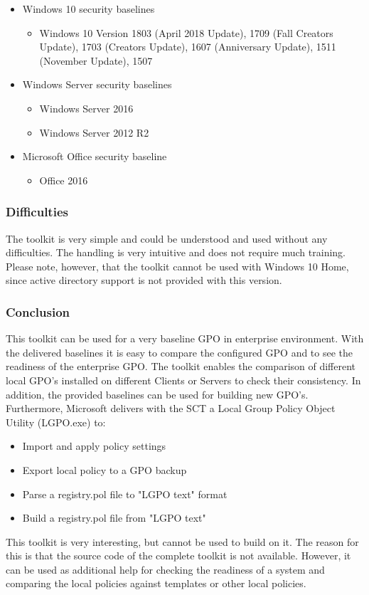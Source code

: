 \begin{itemize}
    \item Windows 10 security baselines
    \begin{itemize}
        \item Windows 10 Version 1803 (April 2018 Update), 1709 (Fall Creators Update), 1703 (Creators Update), 1607 (Anniversary Update), 1511 (November Update), 1507
    \end{itemize}
    \item Windows Server security baselines
    \begin{itemize}
        \item Windows Server 2016
        \item Windows Server 2012 R2
    \end{itemize}
    \item Microsoft Office security baseline
    \begin{itemize}
        \item Office 2016
    \end{itemize}
\end{itemize}

\subsubsection{Difficulties}
The toolkit is very simple and could be understood and used without any difficulties. The handling is very intuitive and does not require much training. Please note, however, that the toolkit cannot be used with Windows 10 Home, since active directory support is not provided with this version.

\subsubsection{Conclusion}
This toolkit can be used for a very baseline GPO in enterprise environment. With the delivered baselines it is easy to compare the configured GPO and to see the readiness of the enterprise GPO. The toolkit enables the comparison of different local GPO's installed on different Clients or Servers to check their consistency. In addition, the provided baselines can be used for building new GPO's. Furthermore, Microsoft delivers with the SCT a Local Group Policy Object Utility (LGPO.exe) to:
\begin{itemize}
    \item Import and apply policy settings
    \item Export local policy to a GPO backup
    \item Parse a registry.pol file to "LGPO text" format
    \item Build a registry.pol file from "LGPO text"
\end{itemize}
This toolkit is very interesting, but cannot be used to build on it. The reason for this is that the source code of the complete toolkit is not available. However, it can be used as additional help for checking the readiness of a system and comparing the local policies against templates or other local policies.

